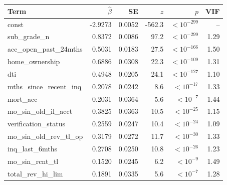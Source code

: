 \begin{tabular}{lrrrrr}
\toprule
Term & $\hat\beta$ & SE & $z$ & $p$ & VIF \\
\midrule
const & -2.9273 & 0.0052 & -562.3 & $<10^{-299}$ & -- \\
sub\_grade\_n & 0.8372 & 0.0086 & 97.2 & $<10^{-299}$ & 1.29 \\
acc\_open\_past\_24mths & 0.5031 & 0.0183 & 27.5 & $<10^{-166}$ & 1.50 \\
home\_ownership & 0.6886 & 0.0308 & 22.3 & $<10^{-109}$ & 1.31 \\
dti & 0.4948 & 0.0205 & 24.1 & $<10^{-127}$ & 1.10 \\
mths\_since\_recent\_inq & 0.2078 & 0.0242 & 8.6 & $<10^{-17}$ & 1.33 \\
mort\_acc & 0.2031 & 0.0364 & 5.6 & $<10^{-7}$ & 1.44 \\
mo\_sin\_old\_il\_acct & 0.3825 & 0.0363 & 10.5 & $<10^{-25}$ & 1.15 \\
verification\_status & 0.2559 & 0.0247 & 10.4 & $<10^{-24}$ & 1.09 \\
mo\_sin\_old\_rev\_tl\_op & 0.3179 & 0.0272 & 11.7 & $<10^{-30}$ & 1.33 \\
inq\_last\_6mths & 0.2708 & 0.0250 & 10.8 & $<10^{-26}$ & 1.23 \\
mo\_sin\_rcnt\_tl & 0.1520 & 0.0245 & 6.2 & $<10^{-9}$ & 1.49 \\
total\_rev\_hi\_lim & 0.1891 & 0.0335 & 5.6 & $<10^{-7}$ & 1.28 \\
\bottomrule
\end{tabular}
